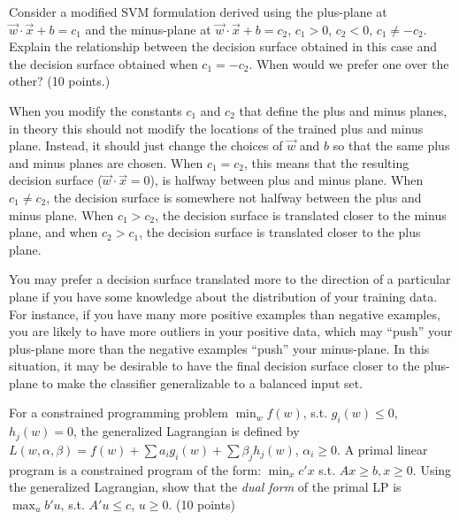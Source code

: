 \documentclass[fleqn]{homework}
\begin{document}
  \maketitle

  \begin{problem}{1}
    \begin{question}
      Consider a modified SVM formulation derived using the plus-plane at
      $\vec{w}\cdot\vec{x} + b = c_1$ and the minus-plane at
      $\vec{w}\cdot\vec{x}+b=c_2$, $c_1>0$, $c_2<0$, $c_1 \ne -c_2$.  Explain
      the relationship between the decision surface obtained in this case and
      the decision surface obtained when $c_1 = -c_2$.  When would we prefer one
      over the other? (10 points.)
    \end{question}

    When you modify the constants $c_1$ and $c_2$ that define the plus and minus
    planes, in theory this should not modify the locations of the trained plus
    and minus plane.  Instead, it should just change the choices of $\vec{w}$
    and $b$ so that the same plus and minus planes are chosen.  When
    $c_1 = c_2$, this means that the resulting decision surface
    ($\vec{w}\cdot\vec{x} = 0$), is halfway between plus and minus plane.  When
    $c_1 \ne c_2$, the decision surface is somewhere not halfway between the
    plus and minus plane.  When $c_1 > c_2$, the decision surface is translated
    closer to the minus plane, and when $c_2 > c_1$, the decision surface is
    translated closer to the plus plane.

    You may prefer a decision surface translated more to the direction of a
    particular plane if you have some knowledge about the distribution of your
    training data.  For instance, if you have many more positive examples than
    negative examples, you are likely to have more outliers in your positive
    data, which may ``push'' your plus-plane more than the negative examples
    ``push'' your minus-plane.  In this situation, it may be desirable to have
    the final decision surface closer to the plus-plane to make the classifier
    generalizable to a balanced input set.
  \end{problem}

  \begin{problem}{2}
    \begin{question}
      For a constrained programming problem $\min_w f(w)$, s.t. $g_i(w) \le 0$,
      $h_j(w) = 0$, the generalized Lagrangian is defined by
      $L(w, \alpha, \beta) = f(w) + \sum a_i g_i(w) + \sum \beta_j h_j(w)$,
      $\alpha_i \ge 0$.  A primal linear program is a constrained program of the
      form: $\min_x c'x$ s.t. $Ax \ge b, x \ge 0$.  Using the generalized
      Lagrangian, show that the \textit{dual form} of the primal LP is
      $\max_u b' u$, s.t. $A' u \le c$, $u \ge 0$. (10 points)
    \end{question}
  \end{problem}
\end{document}
